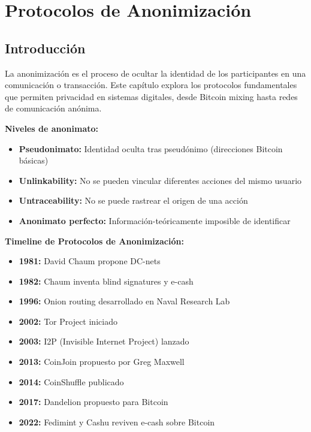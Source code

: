 \documentclass[11pt,a4paper,twoside]{book}
\begin{document}

\chapter{Protocolos de Anonimizaci\'on}
\label{ch:protocolos-anonimizacion}

\section*{Introducci\'on}

La anonimizaci\'on es el proceso de ocultar la identidad de los participantes en una comunicaci\'on o transacci\'on. Este cap\'itulo explora los protocolos fundamentales que permiten privacidad en sistemas digitales, desde Bitcoin mixing hasta redes de comunicaci\'on an\'onima.

\begin{keyidea}
\textbf{Niveles de anonimato:}
\begin{itemize}
    \item \textbf{Pseudonimato:} Identidad oculta tras pseud\'onimo (direcciones Bitcoin b\'asicas)
    \item \textbf{Unlinkability:} No se pueden vincular diferentes acciones del mismo usuario
    \item \textbf{Untraceability:} No se puede rastrear el origen de una acci\'on
    \item \textbf{Anonimato perfecto:} Informaci\'on-te\'oricamente imposible de identificar
\end{itemize}
\end{keyidea}

\begin{mathnote}
\textbf{Timeline de Protocolos de Anonimizaci\'on:}
\begin{itemize}
    \item \textbf{1981:} David Chaum propone DC-nets
    \item \textbf{1982:} Chaum inventa blind signatures y e-cash
    \item \textbf{1996:} Onion routing desarrollado en Naval Research Lab
    \item \textbf{2002:} Tor Project iniciado
    \item \textbf{2003:} I2P (Invisible Internet Project) lanzado
    \item \textbf{2013:} CoinJoin propuesto por Greg Maxwell
    \item \textbf{2014:} CoinShuffle publicado
    \item \textbf{2017:} Dandelion propuesto para Bitcoin
    \item \textbf{2022:} Fedimint y Cashu reviven e-cash sobre Bitcoin
\end{itemize}
\end{mathnote}
\end{document}
